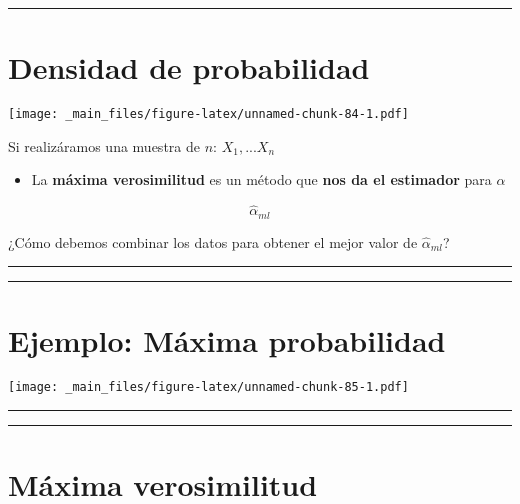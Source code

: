\documentclass[
]{book}
\providecommand{\tightlist}{%
  \setlength{\itemsep}{0pt}\setlength{\parskip}{0pt}}
\begin{document}
\begin{center}\rule{0.5\linewidth}{0.5pt}\end{center}

\hypertarget{densidad-de-probabilidad-1}{%
\section{Densidad de probabilidad}\label{densidad-de-probabilidad-1}}

\texttt{[image: \_main\_files/figure-latex/unnamed-chunk-84-1.pdf]}

Si realizáramos una muestra de \(n\): \(X_1,...X_n\)

\begin{itemize}
\tightlist
\item
  La \textbf{máxima verosimilitud} es un método que \textbf{nos da el estimador} para \(\alpha\)
\end{itemize}

\[\hat{\alpha}_{ml}\]

¿Cómo debemos combinar los datos para obtener el mejor valor de \(\hat{\alpha}_{ml}\)?

\begin{center}\rule{0.5\linewidth}{0.5pt}\end{center}

\begin{center}\rule{0.5\linewidth}{0.5pt}\end{center}

\hypertarget{ejemplo-muxe1xima-probabilidad}{%
\section{Ejemplo: Máxima probabilidad}\label{ejemplo-muxe1xima-probabilidad}}

\texttt{[image: \_main\_files/figure-latex/unnamed-chunk-85-1.pdf]}

\begin{center}\rule{0.5\linewidth}{0.5pt}\end{center}

\begin{center}\rule{0.5\linewidth}{0.5pt}\end{center}

\hypertarget{muxe1xima-verosimilitud-2}{%
\section{Máxima verosimilitud}\label{muxe1xima-verosimilitud-2}}
\end{document}
